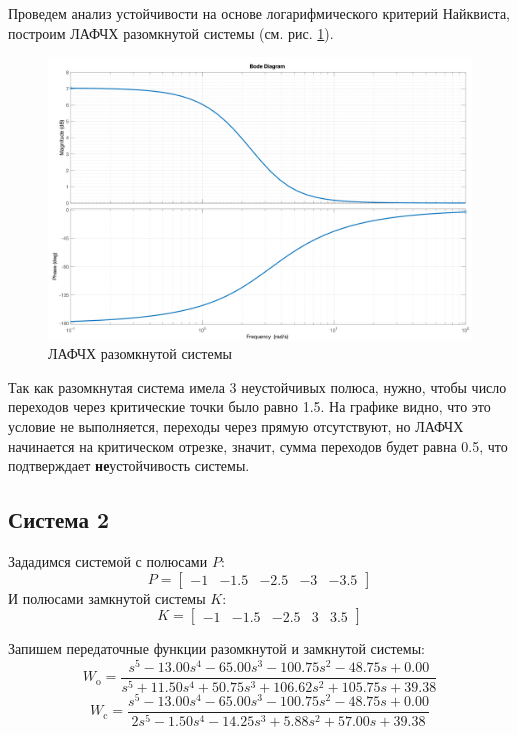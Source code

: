 Проведем анализ устойчивости на основе логарифмического критерий Найквиста, построим ЛАФЧХ разомкнутой системы (см. рис. \ref{fig:task1_bode_open}). 
\begin{figure}[ht!]
    \centering
    \includegraphics[width=\textwidth]{media/plots/task1_bode_open.png}
    \caption{ЛАФЧХ разомкнутой системы}
    \label{fig:task1_bode_open}
\end{figure}

Так как разомкнутая система имела 3 неустойчивых полюса, нужно, чтобы число переходов через критические точки было равно 1.5. 
На графике видно, что это условие не выполняется, переходы через прямую отсутствуют, но ЛАФЧХ начинается на критическом отрезке, 
значит, сумма переходов будет равна 0.5, что подтверждает \textbf{не}устойчивость системы.

\FloatBarrier
\subsection{Система 2}
Зададимся системой с полюсами $P$:
\begin{equation}
    P = \begin{bmatrix}
        -1 & -1.5 & -2.5 & -3 & -3.5
    \end{bmatrix}
\end{equation}
И полюсами замкнутой системы $K$:
\begin{equation}
    K = \begin{bmatrix}
        -1 & -1.5 & -2.5 & 3 & 3.5
    \end{bmatrix}
\end{equation}

Запишем передаточные функции разомкнутой и замкнутой системы:
\begin{equation}
    W_{\text{o}} = \frac{s^5 -13.00s^4 -65.00s^3 -100.75s^2 -48.75s +0.00}{s^5 +11.50s^4 +50.75s^3 +106.62s^2 +105.75s +39.38}
\end{equation}
\begin{equation}
    W_{\text{c}} = \frac{s^5 -13.00s^4 -65.00s^3 -100.75s^2 -48.75s +0.00}{2s^5 -1.50s^4 -14.25s^3 +5.88s^2 +57.00s +39.38}
\end{equation}


